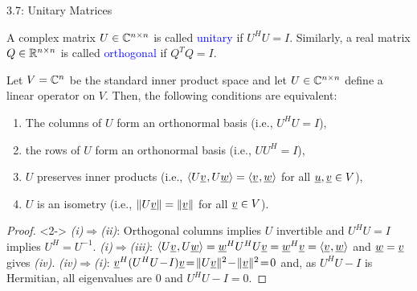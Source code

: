 \documentclass[10pt,letterpaper,english]{beamer}
\begin{document}
\begin{frame}{3.7: Unitary Matrices}

\begin{definition}
A complex matrix $U\in \mathbb{C}^{n\times n}$ is called \textcolor{blue}{unitary} if $U^H U = I$.
Similarly, a real matrix $Q\in \mathbb{R}^{n\times n}$ is called \textcolor{blue}{orthogonal} if $Q^T Q = I$.
\end{definition}

\begin{theorem}
Let $V = \mathbb{C}^n$ be the standard inner product space and let  $U\in \mathbb{C}^{n\times n}$ define a linear operator on $V$.
Then, the following conditions are equivalent:
\begin{enumerate}
\item[(i)] The columns of $U$ form an orthonormal basis (i.e.,  $U^H U = I$),
\item[(ii)] the rows of $U$ form an orthonormal basis (i.e.,  $U U^H = I$),
\item[(iii)] $U$ preserves inner products (i.e., ${\langle  U \underline{v}  \mskip1mu ,  U \underline{w}  \rangle} = {\langle  \underline{v}  \mskip1mu ,  \underline{w}  \rangle}$ for all $\underline{u},\underline{v}\in V$),
\item[(iv)] $U$ is an isometry (i.e., $\| U \underline{v} \| = \| \underline{v}\|$ for all $\underline{v} \in V$).
\end{enumerate}
\end{theorem}
\begin{proof}<2->
{\it(i)}$\Rightarrow${\it(ii)}: Orthogonal columns implies $U$ invertible and $U^H U = I$ implies $U^H = U^{-1}$.
{\it(i)}$\Rightarrow${\it(iii)}: ${\langle  U \underline{v}  \mskip1mu ,  U \underline{w}  \rangle} = \underline{w}^H U^H U \underline{v} = \underline{w}^H \underline{v} = {\langle  \underline{v}  \mskip1mu ,  \underline{w}  \rangle}$ and $\underline{w}=\underline{v}$ gives {\it(iv)}.
{\it(iv)}$\Rightarrow${\it(i)}:
$\vecnot{v}^H (U^H U \!-\! I) \vecnot{v} \!=\! \| U \vecnot{v} \|^2 \!-\! \| \vecnot{v} \|^2 \!=\! 0$
and, as $U^H U \!-\! I$ is Hermitian, all eigenvalues are 0 and $U^H U - I = 0$.
\end{proof}

\end{frame}
\end{document}
